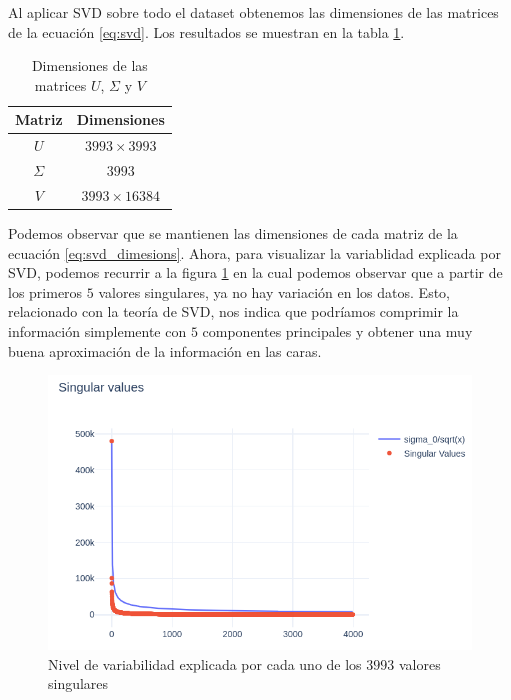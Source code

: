 \documentclass[conference]{IEEEtran}
\begin{document}
Al aplicar SVD sobre todo el dataset obtenemos las dimensiones de las matrices de la ecuación \ref{eq:svd}. Los resultados se muestran en la tabla \ref{tab:svd_dimensions}. 

\begin{table}[H]
    \centering
    \begin{tabular}{|c|c|}
         \hline
         Matriz & Dimensiones \\ \hline
         $U$ & $3993 \times 3993$ \\ \hline
         $\Sigma$ & $3993$ \\ \hline
         $V$ & $3993 \times 16384$ \\ \hline
    \end{tabular}
    \caption{Dimensiones de las matrices $U$, $\Sigma$ y $V$}
    \label{tab:svd_dimensions}
\end{table}

Podemos observar que se mantienen las dimensiones de cada matriz de la ecuación \ref{eq:svd_dimesions}. Ahora, para visualizar la variablidad explicada por SVD, podemos recurrir a la figura \ref{fig:svd_graph} en la cual podemos observar que a partir de los primeros $5$ valores singulares, ya no hay variación en los datos. Esto, relacionado con la teoría de SVD, nos indica que podríamos comprimir la información simplemente con $5$ componentes principales y obtener una muy buena aproximación de la información en las caras. 

\begin{figure}[H]
    \centering
    \includegraphics[scale=0.35]{imgs/svd_variance.png}
    \caption{Nivel de variabilidad explicada por cada uno de los $3993$ valores singulares}
    \label{fig:svd_graph}
\end{figure}
\end{document}
